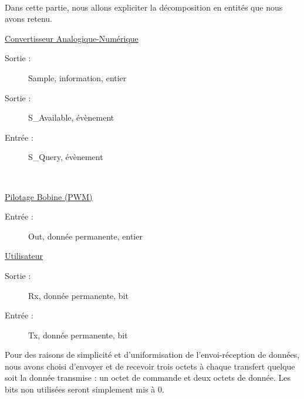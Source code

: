 \documentclass[11pt,french]{article} %
\begin{document}
\paragraph{} Dans cette partie, nous allons expliciter la décomposition en entités que nous avons retenu.
\vspace{0.2in}

\begin{minipage}[t]{9cm}
\hspace{0.2in}
\underline{Convertisseur Analogique-Numérique}
\begin{description}
\item[Sortie :] Sample, information, entier
\item[Sortie :] S\_Available, évènement
\item[Entrée :] S\_Query, évènement
\end{description}


\end{minipage}
~
\begin{minipage}[t]{8cm}
\hspace{0.2in}
\underline{Pilotage Bobine (PWM)}
\begin{description}
\item[Entrée : ] Out, donnée permanente, entier
\end{description}


\end{minipage}

\begin{minipage}[h]{20cm}
\vspace{-1cm}
\hspace{0.2in}
\underline{Utilisateur}   
\begin{description}
\item[Sortie : ] Rx, donnée permanente, bit
\item[Entrée : ] Tx, donnée permanente, bit
\end{description}

 Pour des raisons de simplicité et d'uniformisation de l'envoi-réception de données, nous avons choisi d'envoyer et de recevoir trois octets à chaque transfert quelque soit la donnée transmise : un octet de commande et deux octets de donnée. Les bits non utilisées seront simplement mis à 0. 



\vspace{-2cm}
\end{minipage}

\newpage
\end{document}
